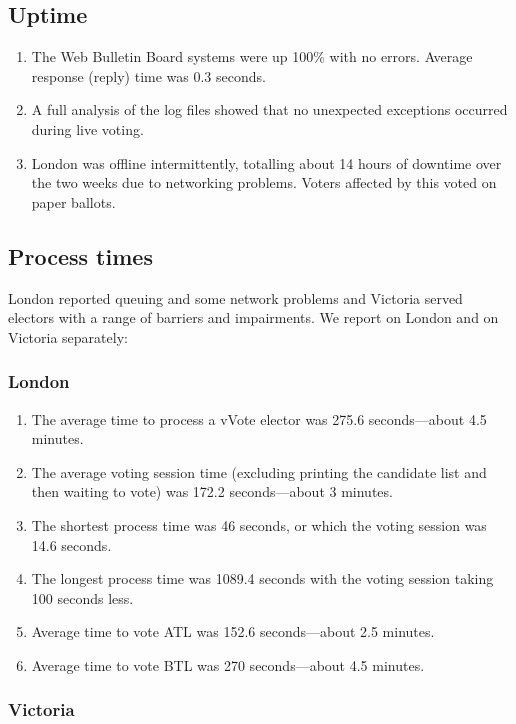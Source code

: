 \documentclass[twocolumn]{article}
\begin{document}
\subsection*{Uptime}
\begin{enumerate}
\item	The Web Bulletin Board systems were up 100\% with no errors.  Average response (reply) time was 0.3 seconds.  
\item A full analysis of the log files showed that no unexpected exceptions occurred during live voting.
\item London was offline intermittently, totalling about 14 hours of downtime over the two weeks due to networking problems.  Voters affected by this voted on paper ballots.
\end{enumerate}

\subsection*{Process times}
London reported queuing and some network problems and Victoria served electors with a range of barriers and impairments.  We report on London and on Victoria separately:
\subsubsection*{London}
\begin{enumerate}
\item The average time to process a vVote elector was 275.6 seconds---about 4.5 minutes.
\item The average voting session time (excluding printing the candidate list and then waiting to vote) was 172.2 seconds---about 3 minutes.   
\item The shortest process time was 46 seconds, or which the voting session was 14.6 seconds.  
\item The longest process time was 1089.4 seconds with the voting session taking 100 seconds less.
\item Average time to vote ATL was 152.6 seconds---about 2.5 minutes.
\item Average time to vote BTL was 270 seconds---about 4.5 minutes.
\end{enumerate}

\subsubsection*{Victoria}
\end{document}

